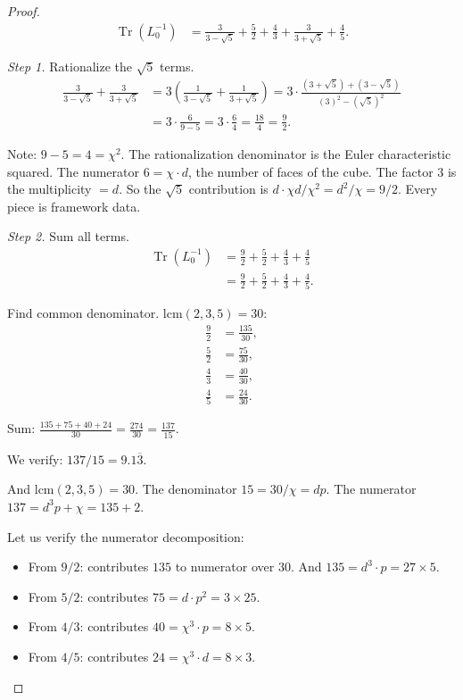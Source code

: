 \documentclass[11pt,a4paper]{article}
\theoremstyle{plain}
\theoremstyle{definition}
\DeclareMathOperator{\Tr}{Tr}
\begin{document}
\begin{proof}
\begin{align}
  \Tr(L_0^{-1})
  &= \frac{3}{3 - \sqrt{5}}
   + \frac{5}{2}
   + \frac{4}{3}
   + \frac{3}{3 + \sqrt{5}}
   + \frac{4}{5}. \label{eq:trace-sum}
\end{align}

\noindent\textit{Step 1.}  Rationalize the $\sqrt{5}$ terms.
\begin{align*}
  \frac{3}{3 - \sqrt{5}} + \frac{3}{3 + \sqrt{5}}
  &= 3\left(\frac{1}{3 - \sqrt{5}} + \frac{1}{3 + \sqrt{5}}\right)
   = 3\cdot\frac{(3 + \sqrt{5}) + (3 - \sqrt{5})}{(3)^2 - (\sqrt{5})^2} \\
  &= 3 \cdot \frac{6}{9 - 5}
   = 3 \cdot \frac{6}{4}
   = \frac{18}{4}
   = \frac{9}{2}.
\end{align*}

Note: $9 - 5 = 4 = \chi^2$.  The rationalization denominator is the
Euler characteristic squared.  The numerator $6 = \chi \cdot d$, the
number of faces of the cube.  The factor $3$ is the multiplicity $= d$.
So the $\sqrt{5}$ contribution is $d \cdot \chi d / \chi^2 = d^2/\chi
= 9/2$.  Every piece is framework data.

\smallskip
\noindent\textit{Step 2.}  Sum all terms.
\begin{align*}
  \Tr(L_0^{-1})
  &= \frac{9}{2} + \frac{5}{2} + \frac{4}{3} + \frac{4}{5} \\
  &= \frac{9}{2} + \frac{5}{2} + \frac{4}{3} + \frac{4}{5}.
\end{align*}

Find common denominator.  $\mathrm{lcm}(2, 3, 5) = 30$:
\begin{align*}
  \frac{9}{2} &= \frac{135}{30}, \\
  \frac{5}{2} &= \frac{75}{30}, \\
  \frac{4}{3} &= \frac{40}{30}, \\
  \frac{4}{5} &= \frac{24}{30}.
\end{align*}

Sum: $\frac{135 + 75 + 40 + 24}{30} = \frac{274}{30} = \frac{137}{15}$.

\medskip
We verify: $137/15 = 9.1\overline{3}$.

And $\mathrm{lcm}(2, 3, 5) = 30$. The denominator $15 = 30/\chi = dp$.
The numerator $137 = d^3 p + \chi = 135 + 2$.

Let us verify the numerator decomposition:
\begin{itemize}[nosep]
  \item From $9/2$: contributes $135$ to numerator over $30$. And
    $135 = d^3 \cdot p = 27 \times 5$.
  \item From $5/2$: contributes $75 = d \cdot p^2 = 3 \times 25$.
  \item From $4/3$: contributes $40 = \chi^3 \cdot p = 8 \times 5$.
  \item From $4/5$: contributes $24 = \chi^3 \cdot d = 8 \times 3$.
\end{itemize}


\end{proof}
\end{document}
